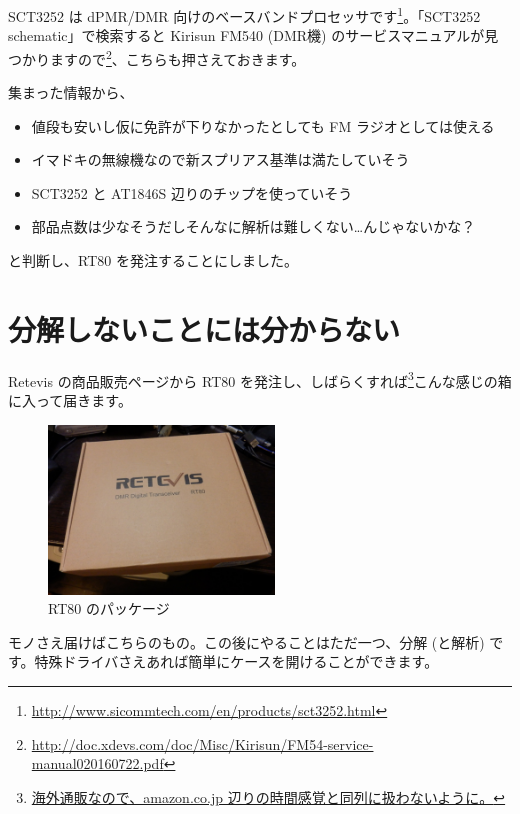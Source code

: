 \documentclass[a4j,oneside]{ujbook}
\begin{document}
SCT3252 は dPMR/DMR 向けのベースバンドプロセッサです\footnote{\url{http://www.sicommtech.com/en/products/sct3252.html}}。「SCT3252 schematic」で検索すると Kirisun FM540 (DMR機) のサービスマニュアルが見つかりますので\footnote{\url{http://doc.xdevs.com/doc/Misc/Kirisun/FM54-service-manual020160722.pdf}}、こちらも押さえておきます。

集まった情報から、
\begin{itemize}
 \item 値段も安いし仮に免許が下りなかったとしても FM ラジオとしては使える
 \item イマドキの無線機なので新スプリアス基準は満たしていそう
 \item SCT3252 と AT1846S 辺りのチップを使っていそう
 \item 部品点数は少なそうだしそんなに解析は難しくない…んじゃないかな？
\end{itemize}
と判断し、RT80 を発注することにしました。

\section{分解しないことには分からない}

Retevis の商品販売ページから RT80 を発注し、しばらくすれば\footnote{\url{海外通販なので、amazon.co.jp 辺りの時間感覚と同列に扱わないように。}}こんな感じの箱に入って届きます。

\begin{figure}[H]
 \centering
 \includegraphics[width=6cm]{img/pa133669.jpg}
 \caption{RT80 のパッケージ}
\end{figure}

モノさえ届けばこちらのもの。この後にやることはただ一つ、分解 (と解析) です。特殊ドライバさえあれば簡単にケースを開けることができます。
\end{document}
